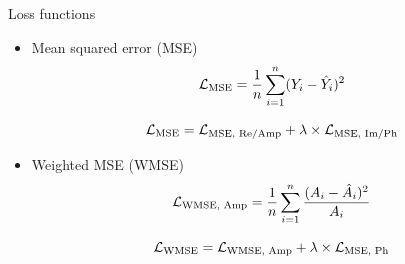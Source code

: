 \documentclass{beamer}
\begin{document}
\begin{frame}[t]{Loss functions}
    \begin{itemize}
        \item Mean squared error (MSE)
        \begin{equation}
            \centering
            \mathcal{L}_{\text{MSE}} = \frac{1}{n} \sum_{i=1}^{n} (Y_i - \hat{Y}_i)^2
        \end{equation}

        \vspace{0.3\baselineskip}
    
        \begin{equation}
            \centering
            \mathcal{L}_{\text{MSE}} = \mathcal{L}_{\text{MSE, Re/Amp}} + \lambda \times \mathcal{L}_{\text{MSE, Im/Ph}}
        \end{equation}

        \vspace{1.5\baselineskip}
        
        \item Weighted MSE (WMSE)
        \begin{equation}
            \centering
            \mathcal{L}_{\text{WMSE, Amp}} = \frac{1}{n} \sum_{i=1}^{n} \frac{(A_i - \hat{A}_i)^2}{A_i}
            \label{amplitude wmse loss equation}
        \end{equation}

        \vspace{0.3\baselineskip}
        
        \begin{equation}
            \centering
            \mathcal{L}_{\text{WMSE}} = \mathcal{L}_{\text{WMSE, Amp}} + \lambda \times \mathcal{L}_{\text{MSE, Ph}}
        \end{equation}
    \end{itemize}
    
    
\end{frame}
\end{document}
